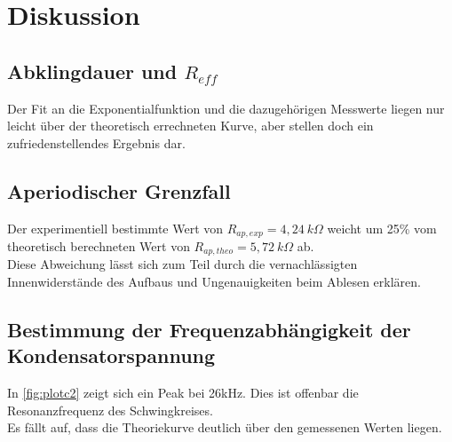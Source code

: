 \section{Diskussion}
\label{sec:Diskussion}


\subsection{Abklingdauer und $R_{eff}$}
\label{subsec:diskussion5a}

Der Fit an die Exponentialfunktion und die dazugehörigen Messwerte liegen nur leicht über der theoretisch 
errechneten Kurve, aber stellen doch ein zufriedenstellendes Ergebnis dar. \\


\subsection{Aperiodischer Grenzfall}
\label{subsec:diskussion5b}

Der experimentiell bestimmte Wert von $R_{ap,exp} = 4,24 \: k\Omega$ weicht um 25\% vom theoretisch berechneten Wert von 
$R_{ap,theo} = 5,72 \: k\Omega$ ab. \\
Diese Abweichung lässt sich zum Teil durch die vernachlässigten Innenwiderstände des Aufbaus und Ungenauigkeiten 
beim Ablesen erklären.\\


\subsection{Bestimmung der Frequenzabhängigkeit der Kondensatorspannung}
\label{subsec:diskussion5c}

In \autoref{fig:plotc2} zeigt sich ein Peak bei 26kHz. Dies ist offenbar die Resonanzfrequenz
des Schwingkreises. \\
Es fällt auf, dass die Theoriekurve deutlich über den gemessenen Werten liegen.\\ %

 

